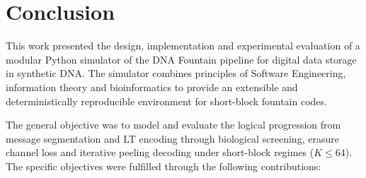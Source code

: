 \chapter{Conclusion}
\label{chap:conclusion}

This work presented the design, implementation and experimental evaluation of a modular Python simulator of the DNA Fountain pipeline for digital data storage in synthetic DNA. The simulator combines principles of Software Engineering, information theory and bioinformatics to provide an extensible and deterministically reproducible environment for short-block fountain codes.

The general objective was to model and evaluate the logical progression from message segmentation and LT encoding through biological screening, erasure channel loss and iterative peeling decoding under short-block regimes ($K \le 64$). The specific objectives were fulfilled through the following contributions:

